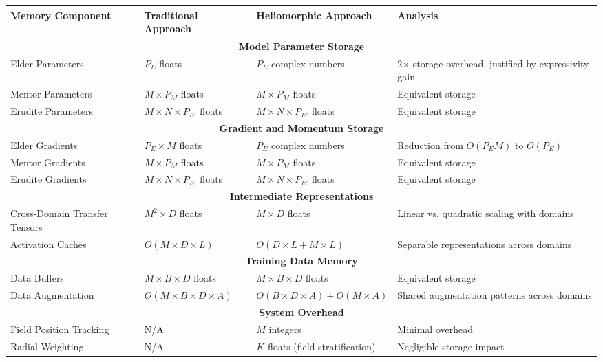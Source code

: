 \begin{table}[h]
\centering
\begin{tabular}{|p{3.5cm}|p{3.5cm}|p{3.5cm}|p{3.5cm}|}
\hline
\textbf{Memory Component} & \textbf{Traditional Approach} & \textbf{Heliomorphic Approach} & \textbf{Analysis} \\
\hline
\multicolumn{4}{|c|}{\textbf{Model Parameter Storage}} \\
\hline
Elder Parameters & $P_E$ floats & $P_E$ complex numbers & 2× storage overhead, justified by expressivity gain \\
\hline
Mentor Parameters & $M \times P_M$ floats & $M \times P_M$ floats & Equivalent storage \\
\hline
Erudite Parameters & $M \times N \times P_{E'}$ floats & $M \times N \times P_{E'}$ floats & Equivalent storage \\
\hline
\multicolumn{4}{|c|}{\textbf{Gradient and Momentum Storage}} \\
\hline
Elder Gradients & $P_E \times M$ floats & $P_E$ complex numbers & Reduction from $O(P_E M)$ to $O(P_E)$ \\
\hline
Mentor Gradients & $M \times P_M$ floats & $M \times P_M$ floats & Equivalent storage \\
\hline
Erudite Gradients & $M \times N \times P_{E'}$ floats & $M \times N \times P_{E'}$ floats & Equivalent storage \\
\hline
\multicolumn{4}{|c|}{\textbf{Intermediate Representations}} \\
\hline
Cross-Domain Transfer Tensors & $M^2 \times D$ floats & $M \times D$ floats & Linear vs. quadratic scaling with domains \\
\hline
Activation Caches & $O(M \times D \times L)$ & $O(D \times L + M \times L)$ & Separable representations across domains \\
\hline
\multicolumn{4}{|c|}{\textbf{Training Data Memory}} \\
\hline
Data Buffers & $M \times B \times D$ floats & $M \times B \times D$ floats & Equivalent storage \\
\hline
Data Augmentation & $O(M \times B \times D \times A)$ & $O(B \times D \times A) + O(M \times A)$ & Shared augmentation patterns across domains \\
\hline
\multicolumn{4}{|c|}{\textbf{System Overhead}} \\
\hline
Field Position Tracking & N/A & $M$ integers & Minimal overhead \\
\hline
Radial Weighting & N/A & $K$ floats (field stratification) & Negligible storage impact \\

\end{tabular}
\end{table}

